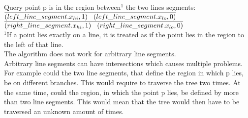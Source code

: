 \documentclass[english, fontsize=12pt, paper=a4, twoside=false, draft=true, pagesize=auto, version=last, DIV=16]{scrartcl}
\theoremstyle{break}
\begin{document}
Query point p is in the region between$^1$ the two lines segments:\\
$\overline{(left\_line\_segment.x_{hi}, 1)\hspace*{3mm}(left\_line\_segment.x_{lo}, 0)}$\\
$\overline{(right\_line\_segment.x_{hi}, 1)\hspace*{3mm}(right\_line\_segment.x_{lo}, 0)}$\\

$^1$If a point lies exactly on a line, it is treated as if the point lies in the region to the left of that line.\\

The algorithm does not work for arbitrary line segments.\\
Arbitrary line segments can have intersections which causes multiple problems. For example could the two line segments, that define the region in which p lies, be on different branches. This would require to traverse the tree two times. At the same time, could the region, in which the point p lies, be defined by more than two line segments. This would mean that the tree would then have to be traversed an unknown amount of times.
\newpage
\end{document}
